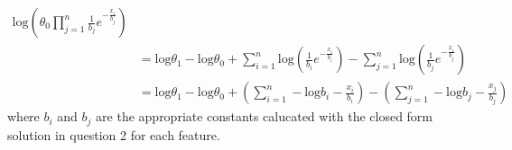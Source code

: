 \documentclass{article}
\begin{document}
\begin{enumerate}
\begin{enumerate}
\begin{align*}
                        \text{log} \left( \theta_0 \prod\limits_{j=1}^n
                            \frac{1}{b_j} e^{-\frac{x_i}{b_j}} \right) \\
                    &= \text{log} \theta_1 - \text{log} \theta_0 +
                        \sum\limits_{i=1}^n \text{log} \left( \frac{1}{b_i} 
                            e^{-\frac{x_i}{b_i}} \right) -
                        \sum\limits_{j=1}^n \text{log} \left( \frac{1}{b_j}
                            e^{-\frac{x_i}{b_j}} \right) \\
                    &=  \text{log} \theta_1 - \text{log} \theta_0 +
                        \left( \sum\limits_{i=1}^n -\text{log} b_i - 
                            \frac{x_i}{b_i} \right)
                         - \left( \sum\limits_{j=1}^n - \text{log} b_j - 
                            \frac{x_j}{b_j} \right)
                \end{align*}
                where \(b_i\) and \(b_j\) are the appropriate constants
                calucated with the closed form solution in question 2 for
                each feature.
        \end{enumerate}
\end{enumerate}
\end{document}
